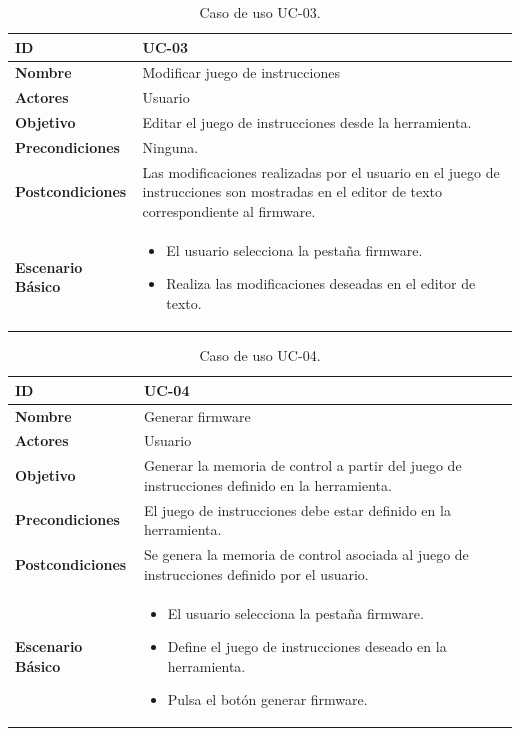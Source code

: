 \begin{center}
\begin{table}[htbp]
\centering
\caption{Caso de uso UC-03.}
\begin{tabular}{@{}p{2.5cm} p{9cm}@{}} 
\toprule
\textbf{ID}	& UC-03  \\
\midrule
\textbf{Nombre} 		& Modificar juego de instrucciones   \\
\midrule
\textbf{Actores} 		&	Usuario  \\
\midrule
\textbf{Objetivo} 	&	Editar el juego de instrucciones desde la herramienta. 	 \\
\midrule
\textbf{Precondiciones}	&	Ninguna.   \\
\midrule
\textbf{Postcondiciones} 	& Las modificaciones realizadas por el usuario en el juego de instrucciones son mostradas en el editor de texto correspondiente al firmware.   \\
\midrule
\textbf{Escenario Básico} 	&  \begin{itemize}
\item El usuario selecciona la pestaña firmware.
\item Realiza las modificaciones deseadas en el editor de texto.
\end{itemize} \\
\bottomrule
\end{tabular}
\label{tab:uc03}
\end{table}
\end{center}

\begin{center}
\begin{table}[htbp]
\centering
\caption{Caso de uso UC-04.}
\begin{tabular}{@{}p{2.5cm} p{9cm}@{}} 
\toprule
\textbf{ID}	& UC-04  \\
\midrule
\textbf{Nombre} 		& Generar firmware   \\
\midrule
\textbf{Actores} 		&	Usuario  \\
\midrule
\textbf{Objetivo} 	&	Generar la memoria de control a partir del juego de instrucciones definido en la herramienta. 	 \\
\midrule
\textbf{Precondiciones}	&	El juego de instrucciones debe estar definido en la herramienta.   \\
\midrule
\textbf{Postcondiciones} 	& Se genera la memoria de control asociada al juego de instrucciones definido por el usuario.   \\
\midrule
\textbf{Escenario Básico} 	&  \begin{itemize}
\item El usuario selecciona la pestaña firmware.
\item Define el juego de instrucciones deseado en la herramienta.
\item Pulsa el botón generar firmware.
\end{itemize} \\
\bottomrule
\end{tabular}
\label{tab:uc04}
\end{table}
\end{center}

